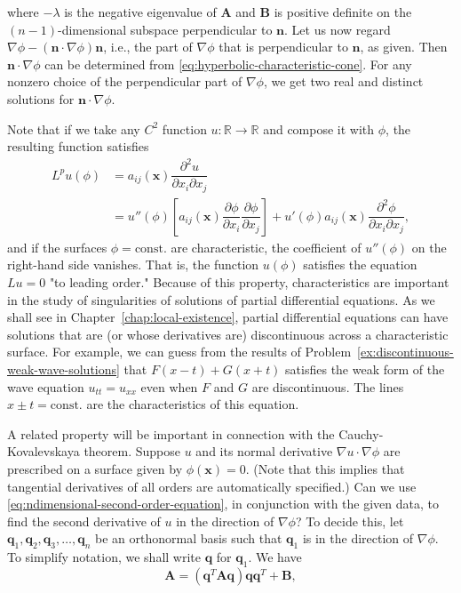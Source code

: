 where $-\lambda$ is the negative eigenvalue of $\bm{A}$ and $\bm{B}$ is positive definite on the $(n-1)$-dimensional subspace perpendicular to $\bm{n}$. Let us now regard $\nabla\phi-(\bm{n}\cdot\nabla\phi)\bm{n}$, i.e., the part of $\nabla\phi$ that is perpendicular to $\bm{n}$, as given. Then $\bm{n}\cdot\nabla\phi$ can be determined from \eqref{eq:hyperbolic-characteristic-cone}. For any nonzero choice of the perpendicular part of $\nabla\phi$, we get two real and distinct solutions for $\bm{n}\cdot\nabla\phi$.

Note that if we take any $C^2$ function $u:\mathbb{R}\to\mathbb{R}$ and compose it with $\phi$, the resulting function satisfies
\begin{equation}\label{eq:characteristic-composed-function}
\begin{aligned}
L^pu(\phi)&=a_{ij}(\bm{x})\dfrac{\partial^2u}{\partial x_i\partial x_j}\\
&=u''(\phi)\left[a_{ij}(\bm{x})\dfrac{\partial\phi}{\partial x_i}\dfrac{\partial\phi}{\partial x_j}\right]
+u'(\phi)a_{ij}(\bm{x})\dfrac{\partial^2\phi}{\partial x_i\partial x_j},
\end{aligned}
\end{equation}
and if the surfaces $\phi=\mathrm{const.}$ are characteristic, the coefficient of $u''(\phi)$ on the right-hand side vanishes. That is, the function $u(\phi)$ satisfies the equation $Lu=0$ "to leading order." Because of this property, characteristics are important in the study of singularities of solutions of partial differential equations. As we shall see in Chapter~\ref{chap:local-existence}, partial differential equations can have solutions that are (or whose derivatives are) discontinuous across a characteristic surface. For example, we can guess from the results of Problem~\ref{ex:discontinuous-weak-wave-solutions} that $F(x-t)+G(x+t)$ satisfies the weak form of the wave equation $u_{tt}=u_{xx}$ even when $F$ and $G$ are discontinuous. The lines $x\pm t=\mathrm{const.}$ are the characteristics of this equation.

A related property will be important in connection with the Cauchy-Kovalevskaya theorem. Suppose $u$ and its normal derivative $\nabla u\cdot\nabla\phi$ are prescribed on a surface given by $\phi(\bm{x})=0$. (Note that this implies that tangential derivatives of all orders are automatically specified.) Can we use \eqref{eq:ndimensional-second-order-equation}, in conjunction with the given data, to find the second derivative of $u$ in the direction of $\nabla\phi$? To decide this, let $\bm{q}_1,\bm{q}_2,\bm{q}_3,\ldots,\bm{q}_n$ be an orthonormal basis such that $\bm{q}_1$ is in the direction of $\nabla\phi$. To simplify notation, we shall write $\bm{q}$ for $\bm{q}_1$. We have
\begin{equation}\label{eq:normal-direction-matrix-decomposition}
\bm{A}=(\bm{q}^T\bm{A}\bm{q})\bm{q}\bm{q}^T+\bm{B},
\end{equation}


